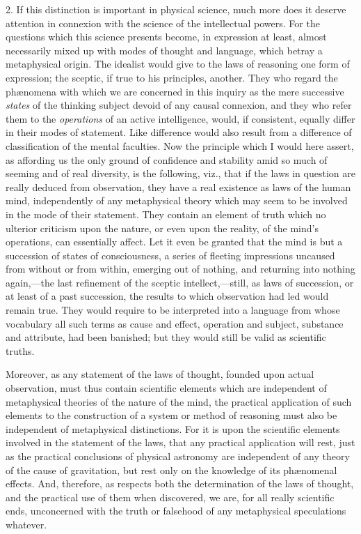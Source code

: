 \documentclass[oneside]{book}
\begin{document}
2. If this distinction is important in physical science, much
more does it deserve attention in connexion with the science of
the intellectual powers. For the questions which this science
presents become, in expression at least, almost necessarily mixed
up with modes of thought and language, which betray a metaphysical
origin. The idealist would give to the laws of reasoning
one form of expression; the sceptic, if true to his principles, another.
They who regard the ph\ae nomena with which we are concerned
in this inquiry as the mere successive \textit{states} of the thinking
subject devoid of any causal connexion, and they who refer them
to the \textit{operations} of an active intelligence, would, if consistent,
equally differ in their modes of statement. Like difference would
also result from a difference of classification of the mental faculties.
Now the principle which I would here assert, as affording us the
only ground of confidence and stability amid so much of seeming
and of real diversity, is the following, viz., that if the laws in question
are really deduced from observation, they have a real existence
as laws of the human mind, independently of any metaphysical
theory which may seem to be involved in the mode of their statement.
They contain an element of truth which no ulterior criticism
upon the nature, or even upon the reality, of the mind's
operations, can essentially affect. Let it even be granted that
the mind is but a succession of states of consciousness, a series
of fleeting impressions uncaused from without or from within,
emerging out of nothing, and returning into nothing again,---the
last refinement of the sceptic intellect,---still, as laws of succession,
or at least of a past succession, the results to which observation
had led would remain true. They would require to be
interpreted into a language from whose vocabulary all such terms
as cause and effect, operation and subject, substance and attribute,
had been banished; but they would still be valid as scientific
truths.

Moreover, as any statement of the laws of thought, founded
upon actual observation, must thus contain scientific elements
which are independent of metaphysical theories of the nature of
the mind, the practical application of such elements to the construction
of a system or method of reasoning must also be independent
of metaphysical distinctions. For it is upon the scientific
elements involved in the statement of the laws, that any
practical application will rest, just as the practical conclusions of
physical astronomy are independent of any theory of the cause
of gravitation, but rest only on the knowledge of its ph\ae{}nomenal
effects. And, therefore, as respects both the determination
of the laws of thought, and the practical use of them
when discovered, we are, for all really scientific ends, unconcerned
with the truth or falsehood of any metaphysical speculations
whatever.
\end{document}
